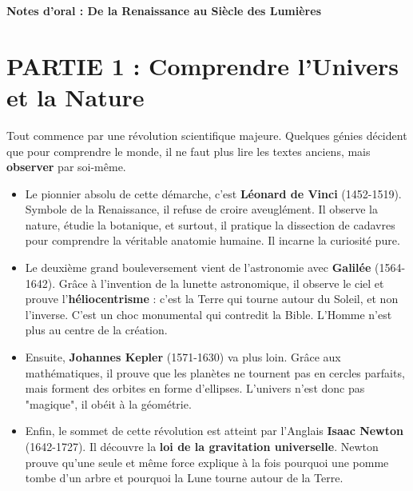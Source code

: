 \documentclass[12pt, a4paper]{article}
\begin{document}
\begin{center}
    \LARGE \textbf{Notes d'oral : De la Renaissance au Siècle des Lumières}
\end{center}
\vspace{1cm}

\vspace{0.5cm}

\section*{PARTIE 1 : Comprendre l'Univers et la Nature}
Tout commence par une révolution scientifique majeure. Quelques génies décident que pour comprendre le monde, il ne faut plus lire les textes anciens, mais \textbf{observer} par soi-même.

\begin{itemize}
    \item Le pionnier absolu de cette démarche, c'est \textbf{Léonard de Vinci} (1452-1519). Symbole de la Renaissance, il refuse de croire aveuglément. Il observe la nature, étudie la botanique, et surtout, il pratique la dissection de cadavres pour comprendre la véritable anatomie humaine. Il incarne la curiosité pure.\\
    
    \item Le deuxième grand bouleversement vient de l'astronomie avec \textbf{Galilée} (1564-1642). Grâce à l'invention de la lunette astronomique, il observe le ciel et prouve l'\textbf{héliocentrisme} : c'est la Terre qui tourne autour du Soleil, et non l'inverse. C'est un choc monumental qui contredit la Bible. L'Homme n'est plus au centre de la création.\\
    
    \item Ensuite, \textbf{Johannes Kepler} (1571-1630) va plus loin. Grâce aux mathématiques, il prouve que les planètes ne tournent pas en cercles parfaits, mais forment des orbites en forme d'ellipses. L'univers n'est donc pas "magique", il obéit à la géométrie.\\
    
    \item Enfin, le sommet de cette révolution est atteint par l'Anglais \textbf{Isaac Newton} (1642-1727). Il découvre la \textbf{loi de la gravitation universelle}. Newton prouve qu'une seule et même force explique à la fois pourquoi une pomme tombe d'un arbre et pourquoi la Lune tourne autour de la Terre. \\
\end{itemize}
\end{document}
